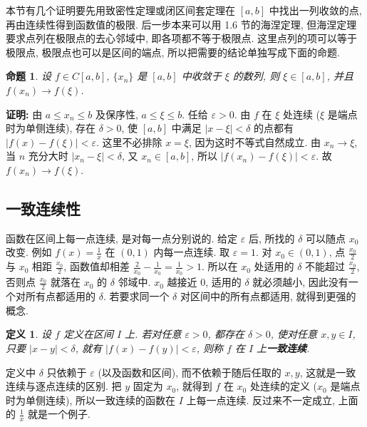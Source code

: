 \documentclass[UTF8,openany]{ctexbook}
\theoremstyle{chinesetextbook}
\newenvironment{cnproof}{\par\indent\textbf{证明:} \ignorespaces}{\par}
\newtheorem*{definitionsingle}{定义}
\newtheorem*{propositionsingle}{命题}
\begin{document}
本节有几个证明要先用致密性定理或闭区间套定理在 $[a,b]$ 中找出一列收敛的点, 再由连续性得到函数值的极限. 后一步本来可以用 1.6 节的海涅定理, 但海涅定理要求点列在极限点的去心邻域中, 即各项都不等于极限点. 这里点列的项可以等于极限点, 极限点也可以是区间的端点, 所以把需要的结论单独写成下面的命题.
\begin{propositionsingle}
设 $f\in C[a,b]$, $\{x_n\}$ 是 $[a,b]$ 中收敛于 $\xi$ 的数列, 则 $\xi\in[a,b]$, 并且 $f(x_n)\to f(\xi)$.
\end{propositionsingle}
\begin{cnproof}
由 $a\le x_n\le b$ 及保序性, $a\le\xi\le b$. 任给 $\varepsilon>0$. 由 $f$ 在 $\xi$ 处连续 ($\xi$ 是端点时为单侧连续), 存在 $\delta>0$, 使 $[a,b]$ 中满足 $|x-\xi|<\delta$ 的点都有 $|f(x)-f(\xi)|<\varepsilon$. 这里不必排除 $x=\xi$, 因为这时不等式自然成立. 由 $x_n\to\xi$, 当 $n$ 充分大时 $|x_n-\xi|<\delta$, 又 $x_n\in[a,b]$, 所以 $|f(x_n)-f(\xi)|<\varepsilon$. 故 $f(x_n)\to f(\xi)$.
\end{cnproof}
\subsection{一致连续性}
函数在区间上每一点连续, 是对每一点分别说的. 给定 $\varepsilon$ 后, 所找的 $\delta$ 可以随点 $x_0$ 改变. 例如 $\displaystyle f(x)=\frac1x$ 在 $(0,1)$ 内每一点连续. 取 $\varepsilon=1$. 对 $x_0\in(0,1)$, 点 $\displaystyle\frac{x_0}2$ 与 $x_0$ 相距 $\displaystyle\frac{x_0}2$, 函数值却相差 $\displaystyle\frac2{x_0}-\frac1{x_0}=\frac1{x_0}>1$. 所以在 $x_0$ 处适用的 $\delta$ 不能超过 $\displaystyle\frac{x_0}2$, 否则点 $\displaystyle\frac{x_0}2$ 就落在 $x_0$ 的 $\delta$ 邻域中. $x_0$ 越接近 $0$, 适用的 $\delta$ 就必须越小, 因此没有一个对所有点都适用的 $\delta$. 若要求同一个 $\delta$ 对区间中的所有点都适用, 就得到更强的概念.
\begin{definitionsingle}
设 $f$ 定义在区间 $I$ 上. 若对任意 $\varepsilon>0$, 都存在 $\delta>0$, 使对任意 $x,y\in I$, 只要 $|x-y|<\delta$, 就有 $|f(x)-f(y)|<\varepsilon$, 则称 $f$ 在 $I$ 上\textbf{一致连续}.
\end{definitionsingle}
定义中 $\delta$ 只依赖于 $\varepsilon$ (以及函数和区间), 而不依赖于随后任取的 $x,y$, 这就是一致连续与逐点连续的区别. 把 $y$ 固定为 $x_0$, 就得到 $f$ 在 $x_0$ 处连续的定义 ($x_0$ 是端点时为单侧连续), 所以一致连续的函数在 $I$ 上每一点连续. 反过来不一定成立, 上面的 $\displaystyle\frac1x$ 就是一个例子.
\end{document}
